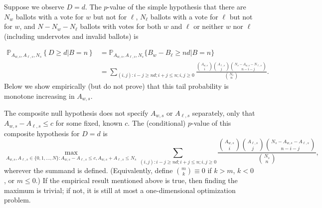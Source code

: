 Suppose we observe $D=d$.
The $p$-value of the simple hypothesis that there are $N_w$ ballots with
a vote for $w$ but not for $\ell$, $N_\ell$ ballots with a vote for $\ell$ but not for $w$, and $N - N_w - N_\ell$ ballots with votes for both $w$ and $\ell$ or neither $w$ nor $\ell$ (including undervotes and
invalid ballots) is

\begin{equation}
\begin{aligned}
   \mathbb{P}_{A_{w,s}, A_{\ell,s}, N_s} \left \{ D \geq d \vert B = n \right \} 
  & = \mathbb{P}_{A_{w,s}, A_{\ell,s}, N_s}\{ B_w - B_\ell \geq nd \vert B = n \} \\
   & = \sum_{(i, j) : i - j \geq nd; i+j \leq n; i, j\geq 0} 
         \frac{ {A_{w,s} \choose i}{A_{\ell,s} \choose j}{N_s - A_{w,s} - N_{\ell,s} \choose n-i-j}}{{N_s \choose n}}.
\end{aligned}
\end{equation}
Below we show empirically (but do not prove) that this tail probability is monotone increasing in $A_{w,s}$.


The composite null hypothesis does not specify $A_{w,s}$ or $A_{\ell,s}$ separately, only 
that $A_{w,s} - A_{\ell,s} \le c$ for
some fixed, known $c$.
The (conditional) $p$-value of this composite hypothesis for $D=d$ is
\begin{equation}
  \max_{A_{w,s}, A_{\ell,s} \in \{0, 1, \ldots, N \}: A_{w,s} - A_{\ell,s} \le c, A_{w,s} + A_{\ell,s} \le N_s}
   \sum_{(i, j) : i - j \geq nd; i+j \leq n; i, j\geq 0} 
         \frac{ {A_{w,s} \choose i}{A_{\ell,s} \choose j}{N_s - A_{w,s} - A_{\ell,s} \choose n-i-j}}{{N_s \choose n}},
\end{equation}
wherever the summand is defined. 
(Equivalently, define ${m \choose k} \equiv 0$ if $k > m$, $k < 0$, or $m \le 0$.)
If the empirical result mentioned above is true, then finding the maximum is trivial; if not,
it is still at most a one-dimensional optimization problem.

